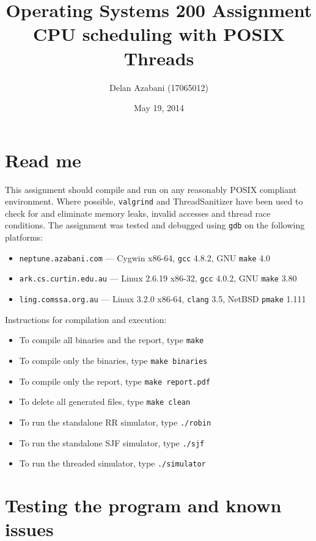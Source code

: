 \documentclass[a4paper,12pt,titlepage]{article}
\title{Operating Systems 200 Assignment\\
       CPU scheduling with POSIX Threads}
\date{May 19, 2014}
\author{Delan Azabani (17065012)}
\begin{document}
\maketitle

\section{Read me}

This assignment should compile and run on any reasonably POSIX compliant
environment. Where possible, \texttt{valgrind} and ThreadSanitizer have been
used to check for and eliminate memory leaks, invalid accesses and thread race
conditions. The assignment was tested and debugged using \texttt{gdb} on the
following platforms:

\begin{itemize}
	\item \texttt{neptune.azabani.com} ---
	      Cygwin x86-64,
	      \texttt{gcc} 4.8.2,
	      GNU \texttt{make} 4.0
	\item \texttt{ark.cs.curtin.edu.au} ---
	      Linux 2.6.19 x86-32,
	      \texttt{gcc} 4.0.2,
	      GNU \texttt{make} 3.80
	\item \texttt{ling.comssa.org.au} ---
	      Linux 3.2.0 x86-64,
	      \texttt{clang} 3.5,
	      NetBSD \texttt{pmake} 1.111
\end{itemize}

Instructions for compilation and execution:

\begin{itemize}
	\item To compile all binaries and the report, type \texttt{make}
	\item To compile only the binaries, type \texttt{make binaries}
	\item To compile only the report, type \texttt{make report.pdf}
	\item To delete all generated files, type \texttt{make clean}
	\item To run the standalone RR simulator, type \texttt{./robin}
	\item To run the standalone SJF simulator, type \texttt{./sjf}
	\item To run the threaded simulator, type \texttt{./simulator}
\end{itemize}

\section{Testing the program and known issues}
\end{document}
